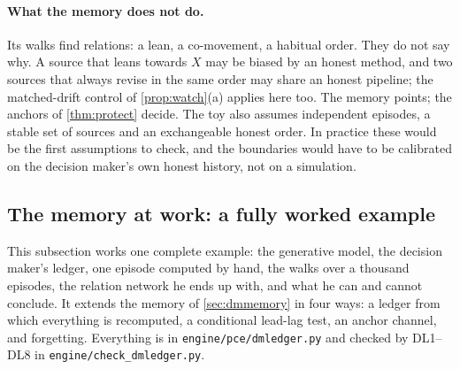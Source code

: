 \documentclass[11pt]{article}
\theoremstyle{definition}\newtheorem{definition}[theorem]{Definition}\newtheorem{remark}[theorem]{Remark}\newtheorem{example}[theorem]{Example}\newtheorem{problem}[theorem]{Open problem}\crefname{problem}{Problem}{Problems}
\begin{document}
\paragraph{What the memory does not do.} Its walks find relations: a lean, a co-movement, a habitual order. They do not say why. A source that leans towards $X$ may be biased by an honest method, and two sources that always revise in the same order may share an honest pipeline; the matched-drift control of \cref{prop:watch}(a) applies here too. The memory points; the anchors of \cref{thm:protect} decide. The toy also assumes independent episodes, a stable set of sources and an exchangeable honest order. In practice these would be the first assumptions to check, and the boundaries would have to be calibrated on the decision maker's own honest history, not on a simulation.


\subsection{The memory at work: a fully worked example}\label{sec:memwork}
This subsection works one complete example: the generative model, the decision maker's ledger, one episode computed by hand, the walks over a thousand episodes, the relation network he ends up with, and what he can and cannot conclude. It extends the memory of \cref{sec:dmmemory} in four ways: a ledger from which everything is recomputed, a conditional lead-lag test, an anchor channel, and forgetting. Everything is in \texttt{engine/pce/dmledger.py} and checked by DL1--DL8 in \texttt{engine/check\_dmledger.py}.
\end{document}
